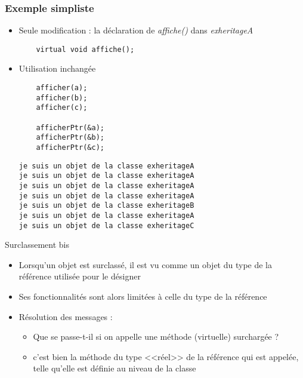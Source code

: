 \begin{frame}[fragile]
\frametitle{Exemple simpliste}
\begin{itemize}
\item Seule modification : la déclaration de \textit{affiche()} dans \textit{exheritageA}
\begin{lstlisting}
    virtual void affiche();
\end{lstlisting}
\item Utilisation inchangée
\begin{lstlisting}
    afficher(a);
    afficher(b);
    afficher(c);
    
    afficherPtr(&a);
    afficherPtr(&b);
    afficherPtr(&c);
\end{lstlisting}
\pause
{\tiny
\begin{verbatim}
je suis un objet de la classe exheritageA
je suis un objet de la classe exheritageA
je suis un objet de la classe exheritageA
je suis un objet de la classe exheritageA
je suis un objet de la classe exheritageB
je suis un objet de la classe exheritageA
je suis un objet de la classe exheritageC
\end{verbatim}
}
\end{itemize}
\end{frame}

\begin{frame}{Surclassement bis}
\begin{itemize}
	\item Lorsqu'un objet est surclassé, il est vu comme un objet du type de la référence utilisée pour le désigner
	\item Ses fonctionnalités sont alors limitées à celle du type de la référence
	\item Résolution des messages :
	\begin{itemize}
		\item Que se passe-t-il si on appelle une méthode (virtuelle) surchargée ?
		\item c'est bien la méthode du type <<réel>> de la référence qui est appelée, telle qu'elle est définie au niveau de la classe
	\end{itemize}
\end{itemize}
\end{frame}

